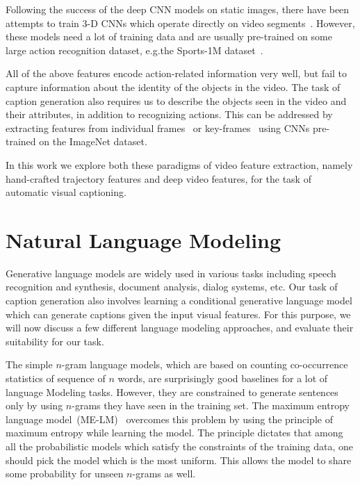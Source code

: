 Following the success of the deep CNN models on static images, there have been
attempts to train 3-D CNNs which operate directly on video
segments~\cite{3dCNN_ji2013, KarpathyCVPR14, DBLP:C3D}.
However, these models need a lot of training data and are usually pre-trained on
some large action recognition dataset, e.g.\@ the Sports-1M
dataset~\cite{KarpathyCVPR14}.

All of the above features encode action-related information very well, but fail to
capture information about the identity of the objects in the video.
The task of caption generation also requires us to describe the objects seen in
the video and their attributes, in addition to recognizing actions.
This can be addressed by extracting features from individual
frames~\cite{venugopalan2015sequence} or key-frames~\cite{shetty2015video} using
CNNs pre-trained on the ImageNet dataset.

In this work we explore both these paradigms of video feature extraction, namely
hand-crafted trajectory features and deep video features, for the task of
automatic visual captioning.

\section{Natural Language Modeling}
Generative language models are widely used in various tasks including speech
recognition and synthesis, document analysis, dialog systems, etc.
Our task of caption generation also involves learning a conditional generative
language model which can generate captions given the input visual features.
For this purpose, we will now discuss a few different language modeling
approaches, and evaluate their suitability for our task.

The simple $n$-gram language models, which are based on counting co-occurrence
statistics of sequence of $n$ words, are surprisingly good baselines for a lot
of language Modeling tasks.
However, they are constrained to generate sentences only by using $n$-grams they
have seen in the training set.
The maximum entropy language model~(ME-LM)~\cite{berger1996maximum} overcomes this
problem by using the principle of maximum entropy while learning the model.
The principle dictates that among all the probabilistic models which satisfy the
constraints of the training data, one should pick the model which is the most
uniform.
This allows the model to share some probability for unseen $n$-grams as well.

